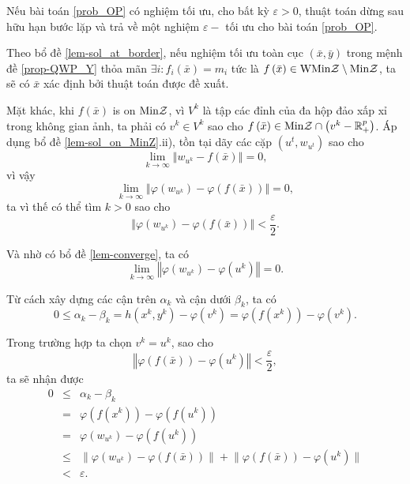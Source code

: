 \begin{dl} Nếu bài toán \ref{prob_OP} có nghiệm tối ưu, cho bất kỳ
$\varepsilon>0$, thuật toán dừng sau hữu hạn bước lặp và trả về một nghiệm $\varepsilon-$ tối ưu cho bài toán \ref{prob_OP}.
\end{dl}

\begin{cm} Theo bổ đề \ref{lem-sol_at_border}, nếu nghiệm tối ưu toàn cục $(\bar{x},\bar{y})$ trong mệnh đề \ref{prop-QWP_Y} thỏa mãn $\exists i:f_{i}\left(\bar{x}\right)=m_{i}$ tức là $f\left(\bar{x}\right)\in{\rm WMin}\mathcal{Z}\setminus{\rm Min}\mathcal{Z}$, ta sẽ có $\bar{x}$ xác định bởi thuật toán được đề xuất.

Mặt khác, khi $f\left(\bar{x}\right)$ is on ${\rm Min}\mathcal{Z}$,
vì $V^{k}$ là tập các đỉnh của đa hộp đảo xấp xỉ trong không gian ảnh, ta phải có $v^{k}\in V^{k}$ sao cho $f\left(\bar{x}\right)\in{\rm Min}\mathcal{Z}\cap\left(v^{k}-\mathbb{R}_{+}^{p}\right)$.
Áp dụng bổ đề \ref{lem-sol_on_MinZ}.ii), tồn tại dãy các cặp
$\left(u^{t},w_{u^{t}}\right)$ sao cho
\[
\lim_{k\rightarrow\infty}\left\Vert w_{u^{k}}-f\left(\bar{x}\right)\right\Vert =0,
\]
vì vậy
\[
\lim_{k\rightarrow\infty}\left\Vert \varphi\left(w_{u^{k}}\right)-\varphi\left(f\left(\bar{x}\right)\right)\right\Vert =0,
\]
ta vì thế có thể tìm $k>0$ sao cho
\[
\left\Vert \varphi\left(w_{u^{k}}\right)-\varphi\left(f\left(\bar{x}\right)\right)\right\Vert <\frac{\varepsilon}{2}.
\]

Và nhờ có bổ đề \ref{lem-converge}, ta có
\[
\lim_{k\rightarrow\infty}\left\Vert \varphi(w_{u^{k}})-\varphi(u^{k})\right\Vert =0.
\]

Từ cách xây dựng các cận trên $\alpha_{k}$ và cận dưới $\beta_{k}$,
ta có
\[
0\le\alpha_{k}-\beta_{k}=h(x^{k},y^{k})-\varphi(v^{k})=\varphi(f(x^{k}))-\varphi(v^{k}).
\]

Trong trường hợp ta chọn $v^{k}=u^{k}$, sao cho
\[
\left\Vert \varphi\left(f\left(\bar{x}\right)\right)-\varphi(u^{k})\right\Vert <\frac{\varepsilon}{2},
\]
ta sẽ nhận được
\begin{eqnarray*}
0 & \leq & \alpha_{k}-\beta_{k}\\
 & = & \varphi(f(x^{k}))-\varphi(f(u^{k}))\\
 & = & \varphi(w_{u^{k}})-\varphi(f(u^{k}))\\
 & \leq & \Big\| \varphi\left(w_{u^{k}}\right)-\varphi\left(f\left(\bar{x}\right)\right)\Big\| +\Big\| \varphi\left(f\left(\bar{x}\right)\right)-\varphi(u^{k})\Big\| \\
 & < & \varepsilon.
\end{eqnarray*}


\end{cm}
